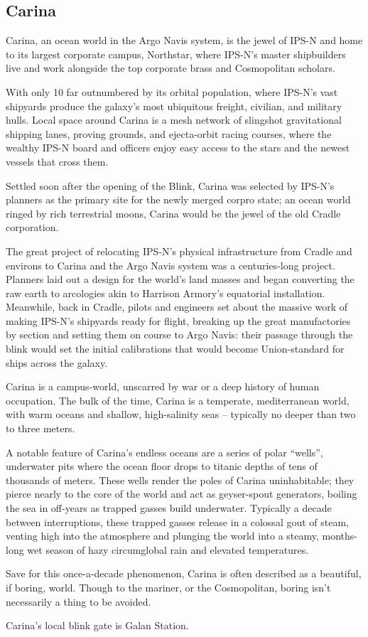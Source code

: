 \subsection{Carina}

Carina, an ocean world in the Argo Navis system, is the jewel of IPS-N and home to its largest
corporate campus, Northstar, where IPS-N's master shipbuilders live and work alongside the top
corporate brass and Cosmopolitan scholars.

With only 10%
far outnumbered by its orbital population, where IPS-N's vast shipyards produce the galaxy's most
ubiquitous freight, civilian, and military hulls. Local space around Carina is a mesh network of
slingshot gravitational shipping lanes, proving grounds, and ejecta-orbit racing courses, where the
wealthy IPS-N board and officers enjoy easy access to the stars and the newest vessels that
cross them.

Settled soon after the opening of the Blink, Carina was selected by IPS-N's planners as the
primary site for the newly merged corpro state; an ocean world ringed by rich terrestrial moons,
Carina would be the jewel of the old Cradle corporation.

The great project of relocating IPS-N's physical infrastructure from Cradle and environs to Carina
and the Argo Navis system was a centuries-long project. Planners laid out a design for the world's
land masses and began converting the raw earth to arcologies akin to Harrison Armory's
equatorial installation. Meanwhile, back in Cradle, pilots and engineers set about the massive
work of making IPS-N's shipyards ready for flight, breaking up the great manufactories by section
and setting them on course to Argo Navis: their passage through the blink would set the initial
calibrations that would become Union-standard for ships across the galaxy.

Carina is a campus-world, unscarred by war or a deep history of human occupation. The bulk of
the time, Carina is a temperate, mediterranean world, with warm oceans and shallow, high-salinity
seas -- typically no deeper than two to three meters.

A notable feature of Carina's endless oceans are a series of polar ``wells'', underwater pits where
the ocean floor drops to titanic depths of tens of thousands of meters. These wells render the
poles of Carina uninhabitable; they pierce nearly to the core of the world and act as geyser-spout
generators, boiling the sea in off-years as trapped gasses build underwater. Typically a decade
between interruptions, these trapped gasses release in a colossal gout of steam, venting high into
the atmosphere and plunging the world into a steamy, months-long wet season of hazy
circumglobal rain and elevated temperatures.

Save for this once-a-decade phenomenon, Carina is often described as a beautiful, if boring,
world. Though to the mariner, or the Cosmopolitan, boring isn't necessarily a thing to be avoided.

Carina's local blink gate is Galan Station.